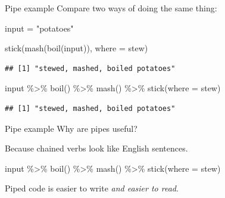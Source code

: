 \documentclass[
  ignorenonframetext,
]{beamer}
\newenvironment{Shaded}{\begin{snugshade}}{\end{snugshade}}
\newcommand{\AttributeTok}[1]{\textcolor[rgb]{0.77,0.63,0.00}{#1}}
\newcommand{\FunctionTok}[1]{\textcolor[rgb]{0.00,0.00,0.00}{#1}}
\newcommand{\NormalTok}[1]{#1}
\newcommand{\OtherTok}[1]{\textcolor[rgb]{0.56,0.35,0.01}{#1}}
\newcommand{\SpecialCharTok}[1]{\textcolor[rgb]{0.00,0.00,0.00}{#1}}
\newcommand{\StringTok}[1]{\textcolor[rgb]{0.31,0.60,0.02}{#1}}
\begin{document}
\begin{frame}[fragile]{Pipe example}
\protect\hypertarget{pipe-example-4}{}
Compare two ways of doing the same thing:

\begin{Shaded}
\begin{Highlighting}[]
\NormalTok{input }\OtherTok{=} \StringTok{"potatoes"}

\FunctionTok{stick}\NormalTok{(}\FunctionTok{mash}\NormalTok{(}\FunctionTok{boil}\NormalTok{(input)), }\AttributeTok{where =} \StringTok{\textquotesingle{}stew\textquotesingle{}}\NormalTok{)}
\end{Highlighting}
\end{Shaded}

\begin{verbatim}
## [1] "stewed, mashed, boiled potatoes"
\end{verbatim}

\begin{Shaded}
\begin{Highlighting}[]
\NormalTok{input }\SpecialCharTok{\%\textgreater{}\%} 
  \FunctionTok{boil}\NormalTok{() }\SpecialCharTok{\%\textgreater{}\%} 
  \FunctionTok{mash}\NormalTok{() }\SpecialCharTok{\%\textgreater{}\%} 
  \FunctionTok{stick}\NormalTok{(}\AttributeTok{where =} \StringTok{\textquotesingle{}stew\textquotesingle{}}\NormalTok{)}
\end{Highlighting}
\end{Shaded}

\begin{verbatim}
## [1] "stewed, mashed, boiled potatoes"
\end{verbatim}
\end{frame}

\begin{frame}[fragile]{Pipe example}
\protect\hypertarget{pipe-example-5}{}
Why are pipes useful?

Because chained verbs look like English sentences.

\begin{Shaded}
\begin{Highlighting}[]
\NormalTok{input }\SpecialCharTok{\%\textgreater{}\%} 
  \FunctionTok{boil}\NormalTok{() }\SpecialCharTok{\%\textgreater{}\%} 
  \FunctionTok{mash}\NormalTok{() }\SpecialCharTok{\%\textgreater{}\%} 
  \FunctionTok{stick}\NormalTok{(}\AttributeTok{where =} \StringTok{\textquotesingle{}stew\textquotesingle{}}\NormalTok{)}
\end{Highlighting}
\end{Shaded}

Piped code is easier to write \emph{and easier to read}.
\end{frame}
\end{document}
